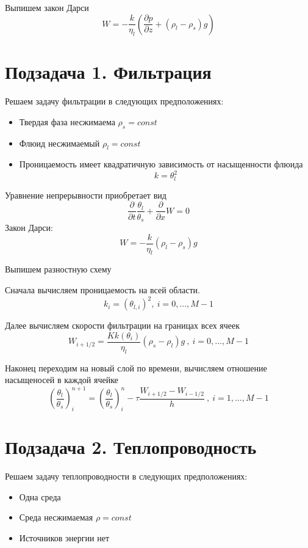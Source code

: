 \documentclass[12pt]{article}
\newcommand{\pd}[2]{\frac{\partial #1}{\partial #2}}
\begin{document}
Выпишем закон Дарси
\begin{equation}
W= -\frac{k}{\eta_l}\left(\pd{p}{z} + (\rho_l-\rho_s)g \right)
\label{Darsi}
\end{equation}
\newpage
\section*{Подзадача 1. Фильтрация}

Решаем задачу фильтрации в следующих предположениях:
\begin{itemize}
\item Твердая фаза несжимаема $\rho_s = const $
\item Флюид несжимаемый $\rho_l = const $
\item Проницаемость имеет квадратичную зависимость от насыщенности флюида
\begin{equation}
k=\theta_l^2
\label{perm}
\end{equation}
\end{itemize}
Уравнение непрерывности приобретает вид
$$
\pd{}{t}\frac{\theta_l}{\theta_s} + \pd{}{x}W = 0
$$
Закон Дарси:
$$
W= -\frac{k}{\eta_l}(\rho_l-\rho_s)g
$$

Выпишем разностную схему

Сначала вычисляем проницаемость на всей области.
\begin{equation}
k_i = (\theta_{l,i})^2 , \ i = 0,  \dots ,M-1
\label{perm_razn}
\end{equation}

Далее вычисляем скорости фильтрации на границах всех ячеек
\begin{equation}
W_{i+1/2} = \frac{K k(\theta_i)}{\eta_l}(\rho_s-\rho_l)g \ , \ i = 0,  \dots ,M-1
\label{Darsi_razn}
\end{equation}

Наконец переходим на новый слой по времени, вычисляем отношение насыщеносей в каждой ячейке
\begin{equation}
\left(\frac{\theta_l}{\theta_s}\right)_i^{n+1} = \left(\frac{\theta_l}{\theta_s}\right)_i^n - \tau\frac{W_{i+1/2} - W_{i-1/2}}{h} \ , \ i = 1,  \dots ,M-1
\label{filtr_razn}
\end{equation}

\newpage
\section*{Подзадача 2. Теплопроводность}
Решаем задачу теплопроводности в следующих предположениях:
\begin{itemize}
\item Одна среда
\item Среда несжимаемая $\rho = const$
\item Источников энергии нет
\end{itemize}
\end{document}
